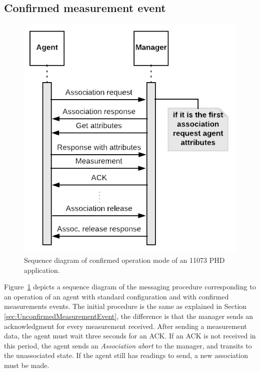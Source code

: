 \subsection{Confirmed measurement event}

\begin{figure}[htbp]
\centerline{\includegraphics[scale=0.35]{figures/confirmed.png}}
\caption{Sequence diagram of confirmed operation mode of an 11073 PHD application.}
\label{fig:confirmedMode}
\end{figure}

Figure~\ref{fig:confirmedMode} depicts a sequence diagram of the messaging procedure corresponding to an operation of an agent with standard configuration and with confirmed measurements events. The initial procedure is the same as explained in Section \ref{sec:UnconfirmedMeasurementEvent}, the difference is that the manager sends an acknowledgment for every measurement received. After sending a measurement data, the agent must wait three seconds for an ACK. If an ACK is not received in this period, the agent sends an \textit{Association abort} to the manager, and transits to the unassociated state. If the agent still has readings to send, a new association must be made. %

